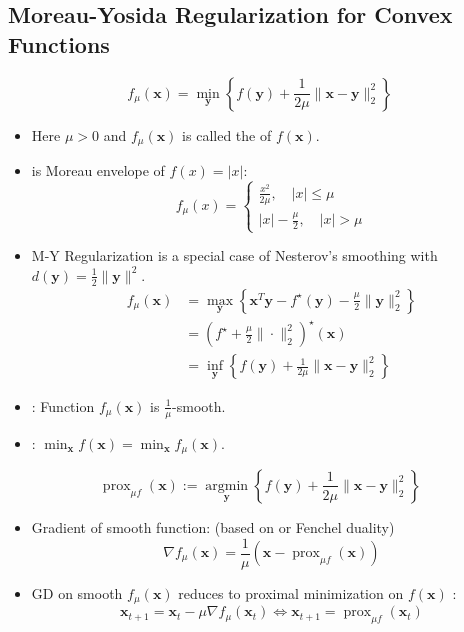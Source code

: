 \subsection*{Moreau-Yosida Regularization for Convex Functions}
$$f_{\mu}(\mathbf{x})=\min _{\mathbf{y}}\left\{f(\mathbf{y})+\frac{1}{2 \mu}\|\mathbf{x}-\mathbf{y}\|_{2}^{2}\right\}$$
\begin{itemize}[leftmargin=*]
    \item Here $\mu>0$ and $f_{\mu}(\mathbf{x})$ is called the  of $f(\mathbf{x})$.
    \item {} is Moreau envelope of $f(x)=|x|$:
$$
f_{\mu}(x)=\left\{\begin{array}{l}
\frac{x^{2}}{2 \mu}, \quad |x| \leq \mu \\
|x|-\frac{\mu}{2},\quad |x|>\mu
\end{array} \right.
$$


    \item M-Y Regularization  is a special case of Nesterov's smoothing with $d(\mathbf{y})=\frac{1}{2}\|\mathbf{y}\|^{2}$.
$$
\begin{aligned}
f_{\mu}(\mathbf{x}) &=\max _{\mathbf{y}}\left\{\mathbf{x}^{T} \mathbf{y}-f^{\star}(\mathbf{y})-\frac{\mu}{2}\|\mathbf{y}\|_{2}^{2}\right\} \\
&=\left(f^{\star}+\frac{\mu}{2}\|\cdot\|_{2}^{2}\right)^{\star}(\mathbf{x}) \\
&=\inf _{\mathbf{y}}\left\{f(\mathbf{y})+\frac{1}{2 \mu}\|\mathbf{x}-\mathbf{y}\|_{2}^{2}\right\}
\end{aligned}
$$
    \item {}: Function $f_{\mu}(\mathbf{x})$ is $\frac{1}{\mu}$-smooth.
    \item {}: $\min _{\mathbf{x}} f(\mathbf{x})=\min _{\mathbf{x}} f_{\mu}(\mathbf{x})$.
\end{itemize}


$$\operatorname{prox}_{\mu f}(\mathbf{x}):=\underset{\mathbf{y}}{\operatorname{argmin}}\left\{f(\mathbf{y})+\frac{1}{2 \mu}\|\mathbf{x}-\mathbf{y}\|_{2}^{2}\right\}$$
\begin{itemize}[leftmargin=*]
    \item Gradient of smooth function: (based on  or Fenchel duality)
$$
\nabla f_{\mu}(\mathbf{x})=\frac{1}{\mu}\left(\mathbf{x}-\operatorname{prox}_{\mu f}(\mathbf{x})\right)
$$
    \item GD on smooth $f_{\mu}(\mathbf{x})$ reduces to proximal minimization on $f(\mathbf{x})$ :
$$
\mathbf{x}_{t+1}=\mathbf{x}_{t}-\mu \nabla f_{\mu}\left(\mathbf{x}_{t}\right) \Longleftrightarrow \mathbf{x}_{t+1}=\operatorname{prox}_{\mu f}\left(\mathbf{x}_{t}\right)
$$
\end{itemize}






